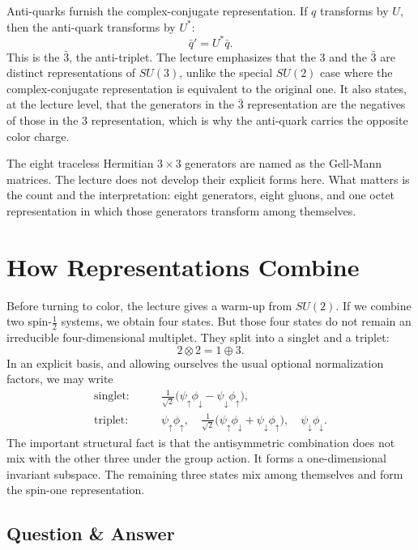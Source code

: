 Anti-quarks furnish the complex-conjugate representation. If \(q\) transforms by \(U\), then the anti-quark transforms by \(U^*\):
\begin{equation}
\bar q' = U^* \bar q.
\end{equation}
This is the \(\bar 3\), the anti-triplet. The lecture emphasizes that the \(3\) and the \(\bar 3\) are distinct representations of \(SU(3)\), unlike the special \(SU(2)\) case where the complex-conjugate representation is equivalent to the original one. It also states, at the lecture level, that the generators in the \(\bar 3\) representation are the negatives of those in the \(3\) representation, which is why the anti-quark carries the opposite color charge.

The eight traceless Hermitian \(3\times3\) generators are named as the Gell-Mann matrices. The lecture does not develop their explicit forms here. What matters is the count and the interpretation: eight generators, eight gluons, and one octet representation in which those generators transform among themselves.

\section{How Representations Combine}

Before turning to color, the lecture gives a warm-up from \(SU(2)\). If we combine two spin-\(\frac12\) systems, we obtain four states. But those four states do not remain an irreducible four-dimensional multiplet. They split into a singlet and a triplet:
\begin{equation}
2\otimes2 = 1\oplus3.
\end{equation}
In an explicit basis, and allowing ourselves the usual optional normalization factors, we may write
\begin{align}
\text{singlet:}\qquad
&\frac{1}{\sqrt2}\bigl(\psi_\uparrow\phi_\downarrow-\psi_\downarrow\phi_\uparrow\bigr),\\
\text{triplet:}\qquad
&\psi_\uparrow\phi_\uparrow,\quad
\frac{1}{\sqrt2}\bigl(\psi_\uparrow\phi_\downarrow+\psi_\downarrow\phi_\uparrow\bigr),\quad
\psi_\downarrow\phi_\downarrow.
\end{align}
The important structural fact is that the antisymmetric combination does not mix with the other three under the group action. It forms a one-dimensional invariant subspace. The remaining three states mix among themselves and form the spin-one representation.

\subsection{Question \& Answer}

